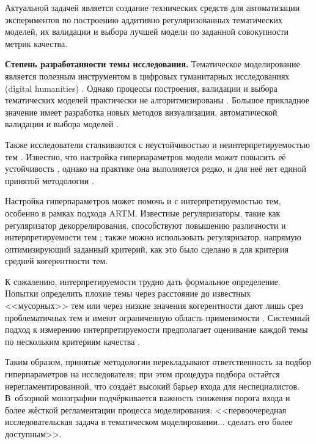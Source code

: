 Актуальной задачей является создание технических средств для автоматизации экспериментов по построению аддитивно регуляризованных тематических моделей, их валидации и выбора лучшей модели по заданной совокупности метрик качества.

\textbf{Степень разработанности темы исследования.}
Тематическое моделирование является полезным инструментом в цифровых гуманитарных исследованиях (digital humanities) \cite{grimmer2013text,paakkonen2020humanistic}. Однако процессы построения, валидации и выбора тематических моделей практически не алгоритмизированы \cite{paakkonen2020humanistic}. Большое прикладное значение имеет разработка новых методов визуализации, автоматической валидации и выбора моделей \cite{dh_sea}.

Также исследователи сталкиваются с неустойчивостью \cite{mantyla2018measuring} и неинтерпретируемостью тем \cite{boydcare}. Известно, что настройка гиперпараметров модели может повысить её устойчивость \cite{agrawal2018wrong}, однако на практике она выполняется редко, и для неё нет единой принятой методологии  \cite{agrawal2018wrong,chen2016survey}.

Настройка гиперпараметров может помочь и с интерпретируемостью тем, особенно в рамках подхода ARTM. Известные регуляризаторы, такие как регуляризатор декоррелирования, способствуют повышению различности и интерпретируемости тем \cite{popov_hier}; также можно использовать  регуляризатор, напрямую оптимизирующий заданный критерий, как это было сделано в \cite{4keys} для критерия средней когерентности тем.

К сожалению, интерпретируемости трудно дать формальное определение. Попытки определить плохие темы через расстояние до известных <<мусорных>> тем или через низкие значения когерентности дают лишь срез проблематичных тем и имеют ограниченную область применимости \cite{boydcare}. Системный подход к измерению интерпретируемости предполагает оценивание каждой темы по нескольким критериям качества \cite{fan2019assessing}.

Таким образом, принятые методологии перекладывают ответственность за подбор гиперпараметров на исследователя; при этом процедура подбора остаётся нерегламентированной, что создаёт высокий барьер входа для неспециалистов.
В~обзорной монографии \cite{fntir2017applications} подчёркивается важность снижения порога входа и более жёсткой регламентации процесса моделирования: <<первоочередная исследовательская задача в тематическом моделировании... сделать его более доступным>>.

